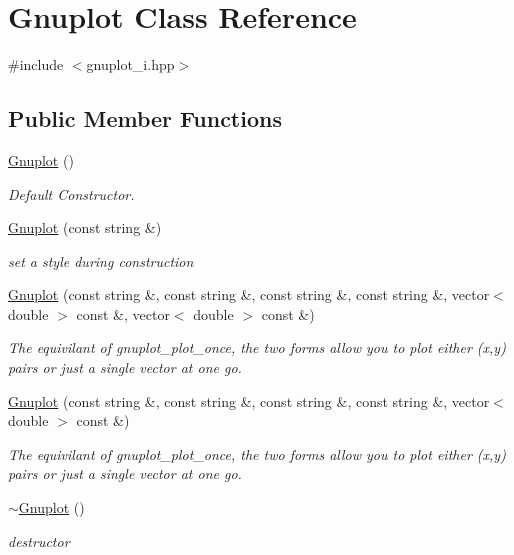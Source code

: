 \hypertarget{class_gnuplot}{}\section{Gnuplot Class Reference}
\label{class_gnuplot}


{\ttfamily \#include $<$gnuplot\+\_\+i.\+hpp$>$}

\subsection*{Public Member Functions}
\begin{DoxyCompactItemize}
\item 
\mbox{\hyperlink{class_gnuplot_a936d27de7b6f57d1f3d61491dc70f1ae}{Gnuplot}} ()
\begin{DoxyCompactList}\small\item\em Default Constructor. \end{DoxyCompactList}\item 
\mbox{\hyperlink{class_gnuplot_a4acdc327a6a9eb3c4ab3f37814dce26e}{Gnuplot}} (const string \&)
\begin{DoxyCompactList}\small\item\em set a style during construction \end{DoxyCompactList}\item 
\mbox{\hyperlink{class_gnuplot_ab777a09e0527b64f3980788f73400257}{Gnuplot}} (const string \&, const string \&, const string \&, const string \&, vector$<$ double $>$ const \&, vector$<$ double $>$ const \&)
\begin{DoxyCompactList}\small\item\em The equivilant of gnuplot\+\_\+plot\+\_\+once, the two forms allow you to plot either (x,y) pairs or just a single vector at one go. \end{DoxyCompactList}\item 
\mbox{\hyperlink{class_gnuplot_a7c87a9e55a3cdc5c559d07744d9856f8}{Gnuplot}} (const string \&, const string \&, const string \&, const string \&, vector$<$ double $>$ const \&)
\begin{DoxyCompactList}\small\item\em The equivilant of gnuplot\+\_\+plot\+\_\+once, the two forms allow you to plot either (x,y) pairs or just a single vector at one go. \end{DoxyCompactList}\item 
\mbox{\hyperlink{class_gnuplot_a78a68f621caa87d1f34324fcd093c7bd}{$\sim$\+Gnuplot}} ()
\begin{DoxyCompactList}\small\item\em destructor \end{DoxyCompactList}\item 

\end{DoxyCompactItemize}
